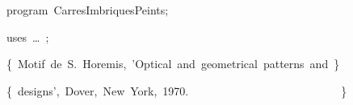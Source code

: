 
{
\parindent {}
\medskip

\carrenoir
\vspace{\neglskip}\mbox{\blc  \idt  \mcl program\idt \label{prog:CarresImbriquesPeints}\ CarresImbriquesPeints$;$
}\par 
\vspace{\neglskip}\mbox{\blc \blk\idt \mcl uses\idt \ \ldots\ $;$
}\par 
\medskip

\vspace{\neglskip}\mbox{\blc  \blk\idt  \cmt  \{\ Motif\ de\ S.\ Horemis,\ {'}Optical\ and\ geometrical\ patterns\ and\ \}\idt }\par 
\vspace{\neglskip}\mbox{\blc  \blk\idt  \cmt  \{\ designs{'},\ Dover,\ New\ York,\ 1970.\ \ \ \ \ \ \ \ \ \ \ \ \ \ \ \ \ \ \ \ \ \ \ \ \ \ \ \}\idt }\par 
\medskip

}
